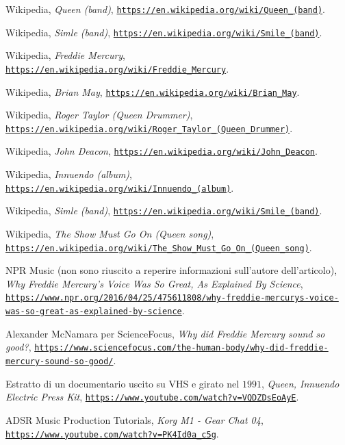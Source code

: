 \documentclass[12pt]{article}
\begin{document}
\begin{thebibliography}{99}

 Wikipedia,
 \textit{Queen (band)},
 \texttt{\url{https://en.wikipedia.org/wiki/Queen_(band)}}.

 Wikipedia,
 \textit{Simle (band)},
 \texttt{\url{https://en.wikipedia.org/wiki/Smile_(band)}}.

 Wikipedia,
 \textit{Freddie Mercury},
 \texttt{\url{https://en.wikipedia.org/wiki/Freddie_Mercury}}.

 Wikipedia,
 \textit{Brian May},
 \texttt{\url{https://en.wikipedia.org/wiki/Brian_May}}.

 Wikipedia,
 \textit{Roger Taylor (Queen Drummer)},
 \texttt{\url{https://en.wikipedia.org/wiki/Roger_Taylor_(Queen_Drummer)}}.

 Wikipedia,
 \textit{John Deacon},
 \texttt{\url{https://en.wikipedia.org/wiki/John_Deacon}}.

 Wikipedia,
 \textit{Innuendo (album)},
 \texttt{\url{https://en.wikipedia.org/wiki/Innuendo_(album)}}.

 Wikipedia,
 \textit{Simle (band)},
 \texttt{\url{https://en.wikipedia.org/wiki/Smile_(band)}}.

 Wikipedia,
 \textit{The Show Must Go On (Queen song)},
 \texttt{\url{https://en.wikipedia.org/wiki/The_Show_Must_Go_On_(Queen_song)}}.

 NPR Music (non sono riuscito a reperire informazioni sull'autore dell'articolo),
 \textit{Why Freddie Mercury's Voice Was So Great, As Explained By Science},
 \texttt{\url{https://www.npr.org/2016/04/25/475611808/why-freddie-mercurys-voice-was-so-great-as-explained-by-science}}.

 Alexander McNamara per ScienceFocus,
 \textit{Why did Freddie Mercury sound so good?},
 \texttt{\url{https://www.sciencefocus.com/the-human-body/why-did-freddie-mercury-sound-so-good/}}.

 Estratto di un documentario uscito su VHS e girato nel \(1991\),
 \textit{Queen, Innuendo Electric Press Kit},
 \texttt{\url{https://www.youtube.com/watch?v=VQDZDsEoAyE}}.

 ADSR Music Production Tutorials,
 \textit{Korg M1 - Gear Chat 04},
 \texttt{\url{https://www.youtube.com/watch?v=PK4Id0a_c5g}}.


\end{thebibliography}
\end{document}
